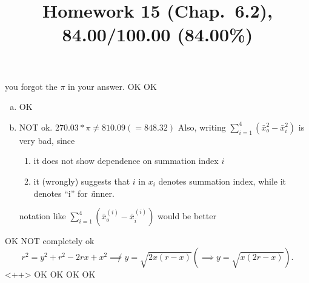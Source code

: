 \documentclass[10pt]{article} %
\title{Homework 15 (Chap.~6.2),
84.00/100.00 (84.00\%)
}
\begin{document}
\maketitle
{}
you forgot the $\pi$ in your answer.
OK
OK
\begin{enumerate}[(a)]
	\item OK
	\item NOT ok. $270.03*\pi\neq810.09\left( =848.32 \right)$
		Also, writing $\sum_{i=1}^4\left( \bar{x}_o^2 -\bar{x}_i^2\right)$ is very bad, since
		\begin{enumerate}
			\item it does not show dependence on summation index $i$
			\item it (wrongly) suggests that $i$ in $x_i$ denotes summation index, while
				it denotes ``i'' for \textit{i}inner.
		\end{enumerate}
		notation like $\sum_{i=1}^4\left( \bar{x}_o^{(i)}-\bar{x}_{i}^{(i)} \right)$ would be better
\end{enumerate}
OK
NOT completely ok
\begin{equation*}
	r^2=y^2+r^2-2rx+x^2\not\implies
	y=\sqrt{2x(r-x)}\left( \implies y=\sqrt{x(2r-x)} \right).
\end{equation*}<++>
OK
OK
OK
OK
\end{document}
